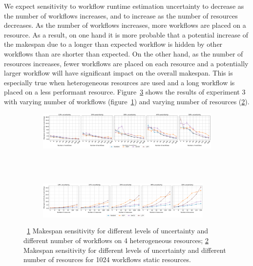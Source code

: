 We expect sensitivity to workflow runtime estimation uncertainty to decrease as
the number of workflows increases, and to increase as the number of resources
decreases. As the number of workflows increases, more workflows are placed on a
resource. As a result, on one hand it is more probable that a potential increase of
the makespan due to a longer than expected workflow is hidden
by other workflows than are shorter than expected. On the other hand, as the
number of resources increases, fewer workflows are placed on each resource and a
potentially larger workflow will have significant impact on the overall
makespan. This is especially true when heterogeneous resources are used and a
long workflow is placed on a less performant resource.
Figure~\ref{fig:inaccur_st} shows the results of experiment 3 with varying
number of workflows (figure~\ref{fig:InaccurStHeteroCampaigns_4StHeteroResourcesSens}) and
varying number of resources (\ref{fig:InaccurStHeteroResources_StHeteroCampaignsSens}).

\begin{figure}[ht!]
    \centering
    \begin{subfigure}[b]{0.95\textwidth}
        \includegraphics[width=.95\textwidth]{figures/campaign/InaccurStHeteroCampaigns_4StHeteroResourcesSens.pdf}
        \caption{}
        \label{fig:InaccurStHeteroCampaigns_4StHeteroResourcesSens}
    \end{subfigure}\\
    ~
    \begin{subfigure}[b]{0.95\textwidth}
        \includegraphics[width=0.95\textwidth]{figures/campaign/InaccurStHeteroResources_StHeteroCampaignsSens.pdf}
        \caption{}
        \label{fig:InaccurStHeteroResources_StHeteroCampaignsSens}
    \end{subfigure}
    \caption{~\ref{fig:InaccurStHeteroCampaigns_4StHeteroResourcesSens} Makespan
    sensitivity for different levels of uncertainty and different number of
    workflows on 4 heterogeneous resources;
    \ref{fig:InaccurStHeteroResources_StHeteroCampaignsSens} Makespan
    sensitivity for different levels of uncertainty and different number of
    resources for 1024 workflows static resources.}
    \label{fig:inaccur_st}
\end{figure}

